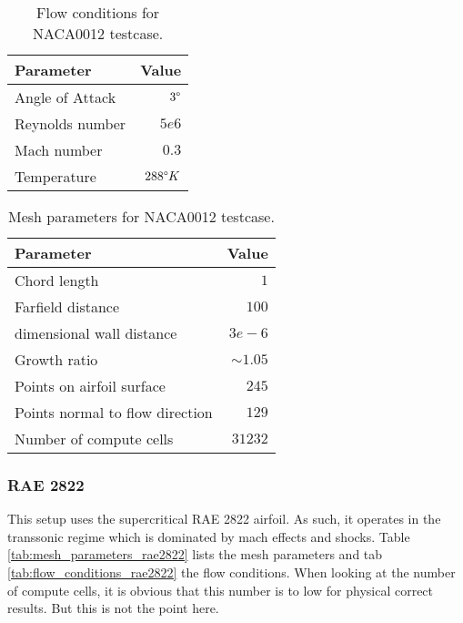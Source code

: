 \begin{table}[H]
    \centering
    \begin{tabular}{l r}
        \toprule
        Parameter                           & Value \\
        \hline
        Angle of Attack                     & $3 \degree$ \\
        Reynolds number                     & $5e6$ \\
        Mach number                         & $0.3$ \\
        Temperature                         & $288 \degree K$\\
        \bottomrule
    \end{tabular}
    \caption{Flow conditions for NACA0012 testcase.}
    \label{tab:flow_conditions_n0012}
\end{table}

\begin{table}[H]
    \centering
    \begin{tabular}{l r}
        \toprule
        Parameter                           & Value \\
        \hline
        Chord length                        & $1$ \\
        Farfield distance                   & $100$ \\
        dimensional wall distance           & $3e-6$ \\
        Growth ratio                        & $\sim 1.05$ \\
        Points on airfoil surface           & $245$\\
        Points normal to flow direction     & $129$ \\
        Number of compute cells             & $31232$\\
        \bottomrule
    \end{tabular}
    \caption{Mesh parameters for NACA0012 testcase.}
    \label{tab:mesh_parameters_n0012}
\end{table}


\subsubsection{RAE 2822}
This setup uses the supercritical RAE 2822 airfoil. As such, it operates in the
transsonic regime which is dominated by mach effects and shocks. Table
\ref{tab:mesh_parameters_rae2822} lists the mesh parameters and tab
\ref{tab:flow_conditions_rae2822} the flow conditions. When looking at the
number of compute cells, it is obvious that this number is to low for physical
correct results. But this is not the point here.

